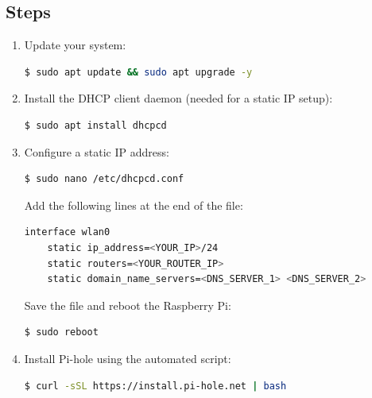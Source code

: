 \documentclass[a4paper,12pt]{article}
\begin{document}
\subsection{Steps}
\begin{enumerate}
    \item Update your system:
    \begin{lstlisting}[language=bash, breaklines=true, breakatwhitespace=true, columns=fullflexible]
    $ sudo apt update && sudo apt upgrade -y
    \end{lstlisting}

    \item Install the DHCP client daemon (needed for a static IP setup):
    \begin{lstlisting}[language=bash, breaklines=true, breakatwhitespace=true, columns=fullflexible]
    $ sudo apt install dhcpcd
    \end{lstlisting}
    
    \item Configure a static IP address:
    \begin{lstlisting}[language=bash, breaklines=true, breakatwhitespace=true, columns=fullflexible]
    $ sudo nano /etc/dhcpcd.conf
    \end{lstlisting}

    Add the following lines at the end of the file:
    \begin{lstlisting}[language=bash, breaklines=true, breakatwhitespace=true, columns=fullflexible]
    interface wlan0
    static ip_address=<YOUR_IP>/24
    static routers=<YOUR_ROUTER_IP>
    static domain_name_servers=<DNS_SERVER_1> <DNS_SERVER_2>
    \end{lstlisting}

    Save the file and reboot the Raspberry Pi:
    \begin{lstlisting}[language=bash, breaklines=true, breakatwhitespace=true, columns=fullflexible]
    $ sudo reboot
    \end{lstlisting}

    \item Install Pi-hole using the automated script:
    \begin{lstlisting}[language=bash, breaklines=true, breakatwhitespace=true, columns=fullflexible]
    $ curl -sSL https://install.pi-hole.net | bash
    \end{lstlisting}


\end{enumerate}
\end{document}
